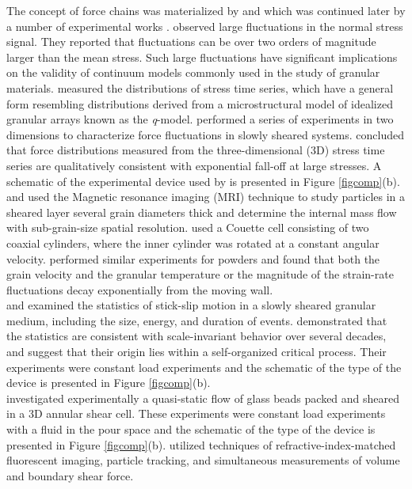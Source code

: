 The concept of force chains was materialized by \citet{Cun79} and
\citet{Liu95} which was continued later by a number of
experimental works \citep{Mil96,How99a,Pet05}. \citeauthor{Mil96}
observed large fluctuations in the normal stress signal. They
reported that fluctuations can be over two orders of magnitude
larger than the mean stress. Such large fluctuations have
significant implications on the validity of continuum models
commonly used in the study of granular materials.
\citeauthor{Mil96} measured the distributions of stress time
series, which have a general form resembling distributions derived
from a microstructural model of idealized granular arrays known as
the \emph{q}-model. \cite{How99b} performed a series of
experiments in two dimensions to characterize force fluctuations
in slowly sheared systems. \citeauthor{Mil96} concluded that force
distributions measured from the three-dimensional
(3D) stress time series
are qualitatively consistent with exponential fall-off at large
stresses. A schematic of the experimental device used by
\citeauthor{Mil96} is presented in Figure \ref{figcomp}(b).\\

\citet{Mue00} and \citet{Mue03} used the Magnetic resonance
imaging (MRI)
technique to study particles in a sheared layer several grain
diameters thick and determine the internal mass flow with
sub-grain-size spatial resolution. \citeauthor{Mue00} used a
Couette cell consisting of two coaxial cylinders, where the inner
cylinder was rotated at a constant angular velocity. \cite{Tar02}
performed similar experiments for powders and found that both the
grain velocity and the granular temperature or the magnitude of
the strain-rate
fluctuations decay exponentially from the moving wall.\\

\citet{Dal01} and \citet{Dal05} examined the statistics of
stick-slip motion in a slowly sheared granular medium, including
the size, energy, and duration of events. \citeauthor{Dal01}
demonstrated that the statistics are consistent with
scale-invariant behavior over several decades, and suggest that
their origin lies within a self-organized critical process. Their
experiments were constant load experiments and the schematic of
the type of the device is
presented in Figure \ref{figcomp}(b).\\

\citet{Tsa03} investigated experimentally a quasi-static flow of
glass beads packed and sheared in a 3D annular shear cell. These
experiments were constant load experiments with a fluid in the
pour space and the schematic of the type of the device is
presented in Figure \ref{figcomp}(b). \citet{Tsa04} utilized
techniques of refractive-index-matched fluorescent imaging,
particle tracking, and simultaneous
measurements of volume and boundary shear force.\\

